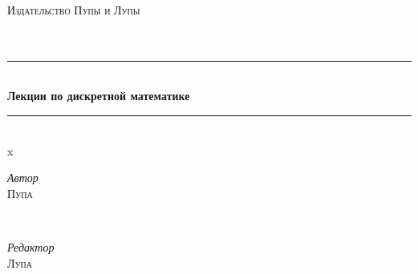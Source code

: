 \documentclass[a4paper,oneside]{article}
\theoremstyle{definition}
\theoremstyle{definition}
\theoremstyle{definition}
\theoremstyle{definition}
\begin{document}

\begin{titlepage} %
	\newcommand{\HRule}{\rule{\linewidth}{0.5mm}} %
	
	\center %
	
	
	\textsc{\LARGE Издательство Пупы и Лупы}\\[1.5cm] %
	
	\textsc{\Large }\\[0.5cm] %
	
	\textsc{\large }\\[0.5cm] %
	
	
	\HRule\\[0.4cm]
	
	{\huge\bfseries Лекции по дискретной математике}\\[0.4cm] %
	
	\HRule\\[1.5cm]x
	
	
	\begin{minipage}{0.4\textwidth}
		\begin{flushleft}
			\large
			\textit{Автор}\\
			\textsc{Пупа} %
		\end{flushleft}
	\end{minipage}
	~
	\begin{minipage}{0.4\textwidth}
		\begin{flushright}
			\large
			\textit{Редактор}\\
			\textsc{Лупа} %
		\end{flushright}
	\end{minipage}
	

\end{titlepage}
\end{document}
